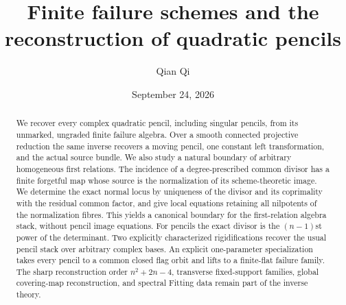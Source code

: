 \title[Finite failure schemes and quadratic pencils]{Finite failure schemes and the reconstruction of quadratic pencils}
\author{Qian Qi}
\date{September 24, 2026}
\begin{abstract}
We recover every complex quadratic pencil, including singular pencils,
from its unmarked, ungraded finite failure algebra.  Over a smooth
connected projective reduction the same inverse recovers a moving
pencil, one constant left transformation, and the actual source bundle.
We also study a natural boundary of arbitrary homogeneous first
relations.  The incidence of a degree-prescribed common divisor has a
finite forgetful map whose source is the normalization of its
scheme-theoretic image.  We determine the exact normal locus by
uniqueness of the divisor and its coprimality with the residual common
factor, and give local equations retaining all nilpotents of the
normalization fibres.  This yields a canonical boundary for the
first-relation algebra stack, without pencil image equations.
For pencils the exact divisor is the $(n-1)$st power of the determinant.
Two explicitly characterized rigidifications recover the usual pencil
stack over arbitrary complex bases.  An explicit one-parameter
specialization takes every pencil to a common closed flag orbit and
lifts to a finite-flat failure family.  The sharp reconstruction order
$n^2+2n-4$, transverse fixed-support families, global covering-map
reconstruction, and spectral Fitting data remain part of the inverse
theory.
\end{abstract}
\maketitle
